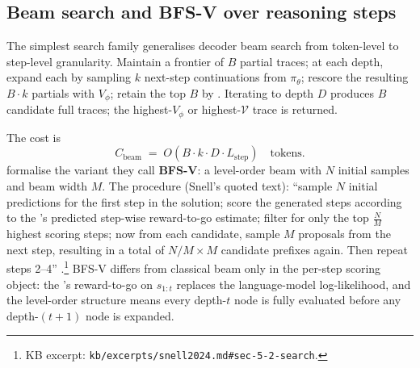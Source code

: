 \subsection{Beam search and BFS-V over reasoning steps}
\label{sec:tree-beam}

The simplest search family generalises decoder beam search from
token-level to step-level granularity. Maintain a frontier of $B$
partial traces; at each depth, expand each by sampling $k$ next-step
continuations from $\pi_\theta$; rescore the resulting $B \cdot k$
partials with $V_\phi$; retain the top $B$ by . Iterating to
depth $D$ produces $B$ candidate full traces; the highest-$V_\phi$ or
highest-$\mathcal{V}$ trace is returned.

The cost is
\begin{equation}
  C_\text{beam} \;=\; O\!\left( B \cdot k \cdot D \cdot L_\text{step} \right)
  \quad\text{tokens.}
  \label{eq:cost-beam}
\end{equation}
\citet[\S 5.2]{snell2024} formalise the variant they call
\textbf{BFS-V}: a level-order beam with $N$ initial samples and beam
width $M$. The procedure (Snell's quoted text): ``sample $N$ initial
predictions for the first step in the solution; score the generated
steps according to the 's predicted step-wise reward-to-go estimate;
filter for only the top $\frac{N}{M}$ highest scoring steps; now from
each candidate, sample $M$ proposals from the next step, resulting in
a total of $N/M \times M$ candidate prefixes again. Then repeat steps
2--4''
\citep[\S 5.2]{snell2024}.\footnote{KB excerpt:
\nolinkurl{kb/excerpts/snell2024.md#sec-5-2-search}.} BFS-V differs from
classical beam only in the per-step scoring object: the 's
reward-to-go on $s_{1:t}$ replaces the language-model log-likelihood,
and the level-order structure means every depth-$t$ node is fully
evaluated before any depth-$(t+1)$ node is expanded.

